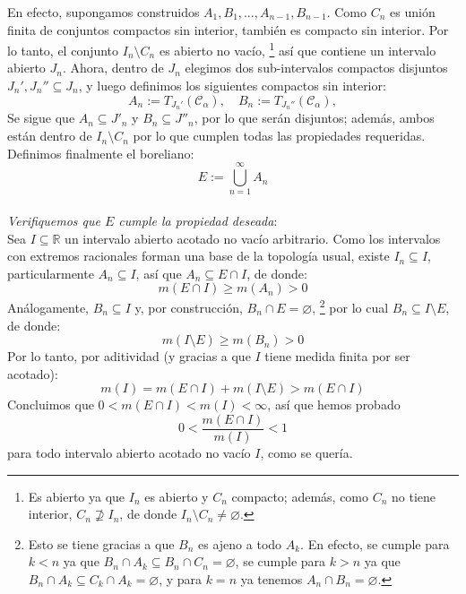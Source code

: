 \begin{sol}
En efecto, supongamos construidos $A_1,B_1,\dots,A_{n-1},B_{n-1}$. Como $C_n$ es unión finita de conjuntos compactos sin interior, también es compacto sin interior. Por lo tanto, el conjunto $I_n\setminus C_n$ es abierto no vacío,%
\footnote{
Es abierto ya que $I_n$ es abierto y $C_n$ compacto; además, como $C_n$ no tiene interior, $C_n \nsupseteq I_n$, de donde $I_n \setminus C_n \neq \varnothing$.
}
así que contiene un intervalo abierto $J_n$. Ahora, dentro de $J_n$ elegimos dos sub-intervalos compactos disjuntos $J_n', J_n'' \subseteq J_n$, y luego definimos los siguientes compactos sin interior:
\[
A_n := T_{J_n'}(\mathcal{C}_\alpha), \quad B_n := T_{J_n''}(\mathcal{C}_\alpha),
\]
Se sigue que $A_n \subseteq J'_n$ y $B_n \subseteq J''_n$, por lo que serán disjuntos; además, ambos están dentro de $I_n \setminus C_n$ por lo que cumplen todas las propiedades requeridas.
Definimos finalmente el boreliano:
\[
E := \bigcup_{n=1}^\infty A_n
\]
\vspace{1em}\\
\emph{Verifiquemos que $E$ cumple la propiedad deseada}:\\
Sea $I \subseteq \mathbb{R}$ un intervalo abierto acotado no vacío arbitrario. Como los intervalos con extremos racionales forman una base de la topología usual, existe $I_n \subseteq I$, particularmente $A_n \subseteq I$, así que $A_n \subseteq E \cap I$, de donde:
\[
 m(E \cap I) \ge m(A_n) > 0
\]
Análogamente, $B_n \subseteq I$ y, por construcción, $B_n \cap E = \varnothing$,%
\footnote{
Esto se tiene gracias a que $B_n$ es ajeno a todo $A_k$. En efecto, se cumple para $k< n$ ya que $B_n \cap A_k  \subseteq B_n \cap C_n = \varnothing$, se cumple para $k>n$ ya que $B_n \cap A_k \subseteq C_k \cap A_k = \varnothing$, y para $k=n$ ya tenemos $A_n \cap B_n = \varnothing$.
}
por lo cual $B_n \subseteq I \setminus E$, de donde:
\[
m(I \setminus E) \ge m(B_n) > 0
\]
Por lo tanto, por aditividad (y gracias a que $I$ tiene medida finita por ser acotado):
\[
m(I) = m(E \cap I) + m(I\setminus E) > m(E \cap I)
\]
Concluimos que $0 < m(E \cap I) < m(I) < \infty$, así que hemos probado
\[
0 < \frac{m(E \cap I)}{m(I)} < 1
\]
para todo intervalo abierto acotado no vacío $I$, como se quería.
\end{sol}